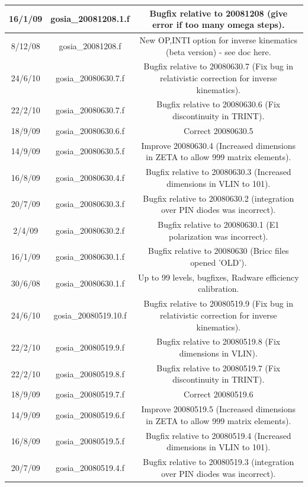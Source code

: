 \documentclass[10pt]{article}
\begin{document}
\begin{center}
\begin{tabular}{|c|c|c|}
\hline
16/1/09 & gosia\_20081208.1.f & Bugfix relative to 20081208 (give error if too many omega steps). \\
\hline
8/12/08 & gosia\_20081208.f & New OP,INTI option for inverse kinematics (beta version) - see doc here. \\
\hline
24/6/10 & gosia\_20080630.7.f & Bugfix relative to 20080630.7 (Fix bug in relativistic correction for inverse kinematics). \\
\hline
22/2/10 & gosia\_20080630.7.f & Bugfix relative to 20080630.6 (Fix discontinuity in TRINT). \\
\hline
18/9/09 & gosia\_20080630.6.f & Correct 20080630.5 \\
\hline
14/9/09 & gosia\_20080630.5.f & Improve 20080630.4 (Increased dimensions in ZETA to allow 999 matrix elements). \\
\hline
16/8/09 & gosia\_20080630.4.f & Bugfix relative to 20080630.3 (Increased dimensions in VLIN to 101). \\
\hline
20/7/09 & gosia\_20080630.3.f & Bugfix relative to 20080630.2 (integration over PIN diodes was incorrect). \\
\hline
2/4/09 & gosia\_20080630.2.f & Bugfix relative to 20080630.1 (E1 polarization was incorrect). \\
\hline
16/1/09 & gosia\_20080630.1.f & Bugfix relative to 20080630 (Bricc files opened 'OLD'). \\
\hline
30/6/08 & gosia\_20080630.1.f & Up to 99 levels, bugfixes, Radware efficiency calibration. \\
\hline
24/6/10 & gosia\_20080519.10.f & Bugfix relative to 20080519.9 (Fix bug in relativistic correction for inverse kinematics). \\
\hline
22/2/10 & gosia\_20080519.9.f & Bugfix relative to 20080519.8 (Fix dimensions in VLIN). \\
\hline
22/2/10 & gosia\_20080519.8.f & Bugfix relative to 20080519.7 (Fix discontinuity in TRINT). \\
\hline
18/9/09 & gosia\_20080519.7.f & Correct 20080519.6 \\
\hline
14/9/09 & gosia\_20080519.6.f & Improve 20080519.5 (Increased dimensions in ZETA to allow 999 matrix elements). \\
\hline
16/8/09 & gosia\_20080519.5.f & Bugfix relative to 20080519.4 (Increased dimensions in VLIN to 101). \\
\hline
20/7/09 & gosia\_20080519.4.f & Bugfix relative to 20080519.3 (integration over PIN diodes was incorrect). \\

\end{tabular}
\end{center}
\end{document}
